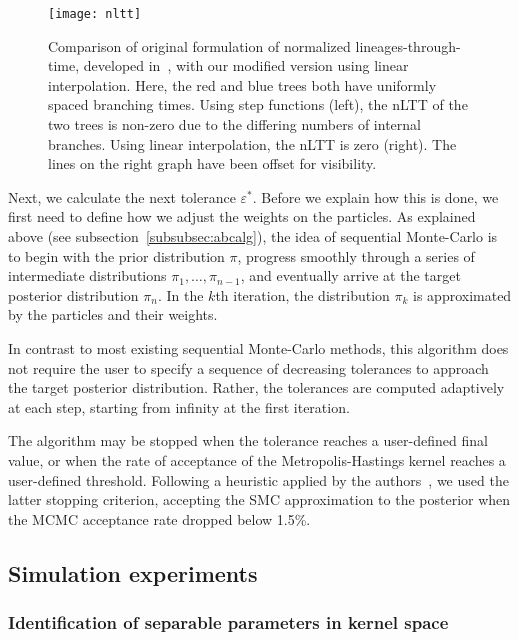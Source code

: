 \begin{figure}[ht]
  \centering
  \caption[Comparison of original and modified normalised lineages-through-time]
    {Comparison of original formulation of normalized lineages-through-time,
     developed in~\autocite{janzen2015approximate}, with our modified version
     using linear interpolation. Here, the red and blue trees both have
     uniformly spaced branching times. Using step functions (left), the nLTT
     of the two trees is non-zero due to the differing numbers of internal
     branches. Using linear interpolation, the nLTT is zero (right). The lines
     on the right graph have been offset for visibility.}
  \texttt{[image: nltt]}
  \label{fig:nltt}
\end{figure}



Next, we calculate the next tolerance $\varepsilon^*$. Before we explain how
this is done, we first need to define how we adjust the weights on the
particles. As explained above (see subsection~\ref{subsubsec:abcalg}), the idea
of sequential Monte-Carlo is to begin with the prior distribution $\pi$,
progress smoothly through a series of intermediate distributions $\pi_1,
\ldots, \pi_{n-1}$, and eventually arrive at the target posterior distribution
$\pi_n$. In the $k$th iteration, the distribution $\pi_k$ is approximated by
the particles and their weights. 

In contrast to most existing sequential Monte-Carlo methods, this
algorithm does not require the user to specify a sequence of decreasing
tolerances to approach the target posterior distribution. Rather, the
tolerances are computed adaptively at each step, starting from infinity at the
first iteration. 

The algorithm may be stopped when the tolerance reaches a
user-defined final value, or when the rate of acceptance of the
Metropolis-Hastings kernel reaches a user-defined threshold. Following a
heuristic applied by the authors~\autocite{del2012adaptive}, we used the latter
stopping criterion, accepting the SMC approximation to the posterior when the
\gls{MCMC} acceptance rate dropped below 1.5\%.

\subsection{Simulation experiments}

\subsubsection{Identification of separable parameters in kernel space}
\label{subsubsec:kernel}


